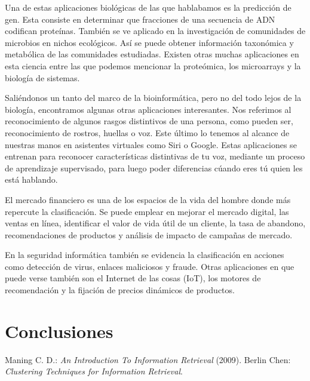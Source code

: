 \documentclass{llncs}
\begin{document}
Una de estas aplicaciones biol\'ogicas de las que hablabamos es la predicci\'on de gen. Esta consiste en determinar que fracciones de una secuencia de ADN codifican prote\'inas. Tambi\'en se ve aplicado en la investigaci\'on de comunidades de microbios en nichos ecol\'ogicos. As\'i se puede obtener informaci\'on taxon\'omica y metab\'olica de las comunidades estudiadas. Existen otras muchas aplicaciones en esta ciencia entre las que podemos mencionar la prote\'omica, los microarrays y la biolog\'ia de sistemas.

Sali\'endonos un tanto del marco de la bioinform\'atica, pero no del todo lejos de la biolog\'ia, encontramos algunas otras aplicaciones interesantes. Nos referimos al reconocimiento de algunos rasgos distintivos de una persona, como pueden ser, reconocimiento de rostros, huellas o voz. Este \'ultimo lo tenemos al alcance de nuestras manos en asistentes virtuales como Siri o  Google. Estas aplicaciones se entrenan para reconocer caracter\'isticas distintivas de tu voz, mediante un proceso de aprendizaje supervisado, para luego poder diferencias c\'uando eres t\'u quien les est\'a hablando.

El mercado financiero es una de los espacios de la vida del hombre donde m\'as repercute la clasificaci\'on. Se puede emplear en mejorar el mercado digital, las ventas en l\'inea, identificar el valor de vida \'util de un cliente, la tasa de abandono, recomendaciones de productos y an\'alisis de impacto de campa\~nas de mercado.

En la seguridad inform\'atica tambi\'en se evidencia la clasificaci\'on en acciones como detecci\'on de virus, enlaces maliciosos y fraude. Otras aplicaciones en que puede verse tambi\'en son el Internet de las cosas (IoT), los motores de recomendaci\'on y la fijaci\'on de precios din\'amicos de productos.

\section{Conclusiones}

\begin{thebibliography}{20}
	 Maning C. D.: \emph{An Introduction To Information Retrieval} (2009).
	 Berlin Chen: \emph{Clustering Techniques for
		Information Retrieval}.
\end{thebibliography}
\end{document}
